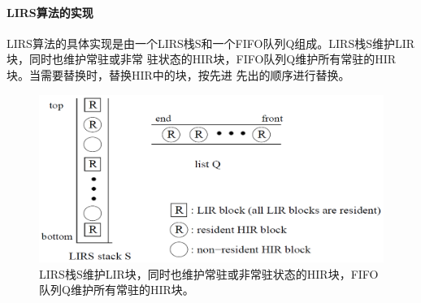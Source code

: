 \paragraph{LIRS算法的实现\\[5pt]}
LIRS算法的具体实现是由一个LIRS栈S和一个FIFO队列Q组成。LIRS栈S维护LIR块，同时也维护常驻或非常
驻状态的HIR块，FIFO队列Q维护所有常驻的HIR块。当需要替换时，替换HIR中的块，按先进
先出的顺序进行替换。
\begin{figure}[H]
\centering
\includegraphics[keepaspectratio, scale=0.4]{pitures/lirsstack.png}
\caption{LIRS栈S维护LIR块，同时也维护常驻或非常驻状态的HIR块，FIFO队列Q维护所有常驻的HIR块。} 
\end{figure}


